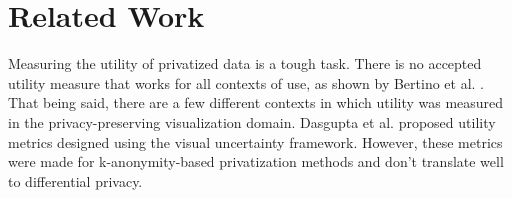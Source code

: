 \documentclass[journal]{vgtc}                     %
\begin{document}
    
    


\section{Related Work}
Measuring the utility of privatized data is a tough task. There is no accepted utility measure that works for all contexts of use, as shown by Bertino et al. \cite{Bertino2008}. That being said, there are a few different contexts in which utility was measured in the privacy-preserving visualization domain. Dasgupta et al. \cite{Dasgupta2013} proposed utility metrics designed using the visual uncertainty framework. However, these metrics were made for k-anonymity-based privatization methods and don't translate well to differential privacy.
\end{document}
